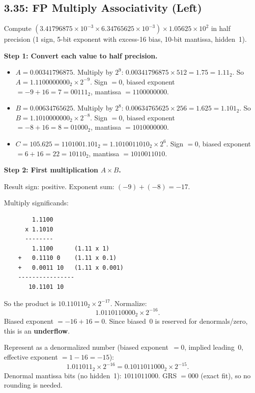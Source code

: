 \subsection*{3.35: FP Multiply Associativity (Left)}
\hypertarget{sol-3.35}{}

Compute $(3.41796875 \times 10^{-3} \times 6.34765625 \times 10^{-3})
\times 1.05625 \times 10^{2}$ in half precision (1 sign, 5-bit exponent with
excess-16 bias, 10-bit mantissa, hidden~1).

\medskip\noindent\textbf{Step 1: Convert each value to half precision.}

\begin{itemize}
  \item $A = 0.00341796875$.
        Multiply by $2^{9}$: $0.00341796875 \times 512 = 1.75 = 1.11_2$.
        So $A = 1.1100000000_2 \times 2^{-9}$.
        Sign $= 0$, biased exponent $= -9 + 16 = 7 = 00111_2$,
        mantissa $= 1100000000$.
  \item $B = 0.00634765625$.
        Multiply by $2^{8}$: $0.00634765625 \times 256 = 1.625 = 1.101_2$.
        So $B = 1.1010000000_2 \times 2^{-8}$.
        Sign $= 0$, biased exponent $= -8 + 16 = 8 = 01000_2$,
        mantissa $= 1010000000$.
  \item $C = 105.625 = 1101001.101_2 = 1.1010011010_2 \times 2^{6}$.
        Sign $= 0$, biased exponent $= 6 + 16 = 22 = 10110_2$,
        mantissa $= 1010011010$.
\end{itemize}

\noindent\textbf{Step 2: First multiplication $A \times B$.}

Result sign: positive.  Exponent sum: $(-9) + (-8) = -17$.

Multiply significands:
\begin{verbatim}
        1.1100
      x 1.1010
      --------
        1.1100      (1.11 x 1)
    +   0.1110 0    (1.11 x 0.1)
    +   0.0011 10   (1.11 x 0.001)
    ----------------
       10.1101 10
\end{verbatim}

\noindent So the product is $10.110110_2 \times 2^{-17}$.  Normalize:
\[
  1.0110110000_2 \times 2^{-16}.
\]
Biased exponent $= -16 + 16 = 0$.  Since biased~0 is reserved for
denormals/zero, this is an \textbf{underflow}.

Represent as a denormalized number (biased exponent~$= 0$, implied leading~0,
effective exponent $= 1 - 16 = -15$):
\[
  1.011011_2 \times 2^{-16} = 0.1011011000_2 \times 2^{-15}.
\]
Denormal mantissa bits (no hidden~1): $1011011000$.  GRS $= 000$ (exact fit),
so no rounding is needed.

